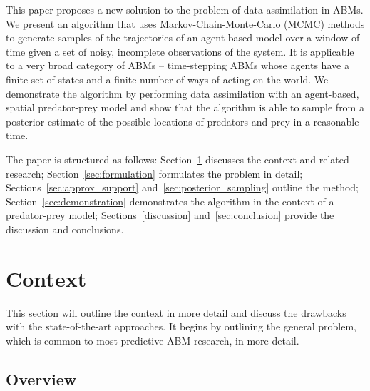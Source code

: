 \documentclass{article}
\begin{document}
This paper proposes a new solution to the problem of data assimilation in ABMs. We present an algorithm that uses Markov-Chain-Monte-Carlo (MCMC) methods to generate samples of the trajectories of an agent-based model over a window of time given a set of noisy, incomplete observations of the system. It is applicable to a very broad category of ABMs -- time-stepping ABMs whose agents have a finite set of states and a finite number of ways of acting on the world. We demonstrate the algorithm by performing data assimilation with an agent-based, spatial predator-prey model and show that the algorithm is able to sample from a posterior estimate of the possible locations of predators and prey in a reasonable time.

The paper is structured as follows: Section~\ref{sec:context} discusses the context and related research; Section~\ref{sec:formulation} formulates the problem in detail; Sections~\ref{sec:approx_support} and~\ref{sec:posterior_sampling} outline the method; Section~\ref{sec:demonstration} demonstrates the algorithm in the context of a predator-prey model; Sections~\ref{discussion} and~\ref{sec:conclusion} provide the discussion and conclusions.


\section{Context}\label{sec:context}

This section will outline the context in more detail and discuss the drawbacks with the state-of-the-art approaches. It begins by outlining the general problem, which is common to most predictive ABM research, in more detail. 

\subsection{Overview}
\end{document}
